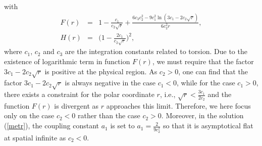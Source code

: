 \documentclass[aps,showpacs,preprintnumbers,amsmath,amssymb]{revtex4}
\begin{document}
with
\begin{eqnarray}
\label{sol1}
F(r)&=&1-\frac{c_1}{c_2\sqrt{r}}+\frac{6c_3c^2_2-9c^2_1\ln(3c_1-2c_2\sqrt{r})}{6c^2_2r},
\nonumber\\
H(r)&=&\bigg(1-\frac{2c_1}{c_2\sqrt{r}}\bigg)^2,
\end{eqnarray}
where $c_1$, $c_2$ and $c_3$ are the integration constants related to torsion.
Due to the existence of logarithmic term in function $F(r)$, we must require that the factor $3c_1-2c_2\sqrt{r}$ is positive at the physical region. As $c_2>0$, one can find that the factor $3c_1-2c_2\sqrt{r}$ is always negative in the case $c_1<0$, while for the case $c_1>0$, there exists a constraint for the polar coordinate $r$, i.e., $\sqrt{r}<\frac{3c_1}{2c_2}$ and the function $F(r)$ is divergent  as $r$ approaches this limit. Therefore, we here focus only on the case $c_2<0$ rather than the case $c_2>0$. Moreover, in the solution (\ref{metr}), the coupling constant $a_1$ is set to $a_1=\frac{2}{9c^2_2}$ so that it is asymptotical flat at spatial infinite as $c_2<0$.
\end{document}
